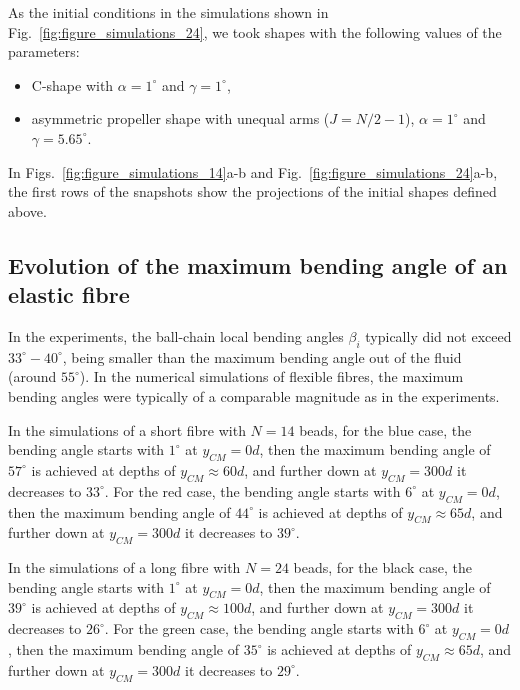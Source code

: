 \documentclass{article}
\begin{document}
As the initial conditions in the simulations shown in Fig.~\ref{fig:figure_simulations_24}, we took shapes with the following values of the parameters: 
\begin{itemize}
    \item C-shape with $\alpha=1^{\circ}$ and $\gamma=1^{\circ}$, %
    \item asymmetric propeller shape with unequal arms ($J\!=\!N/2-1$), $\alpha=1^{\circ}$ and $\gamma=5.65^{\circ}$. %
\end{itemize}

In Figs.~\ref{fig:figure_simulations_14}a-b and Fig.~\ref{fig:figure_simulations_24}a-b, the first rows of the snapshots show the projections of the initial shapes defined above. 

    

\subsection{Evolution of the maximum  bending angle of an elastic fibre} %

In the experiments, the ball-chain local bending angles $\beta_i$ typically did not exceed $33^{\circ}-40^{\circ}$, being smaller than the maximum bending angle out of the fluid (around $55^{\circ}$). In the numerical simulations of flexible fibres, the maximum bending angles were typically of a comparable magnitude as in the experiments. 

In the simulations of a short fibre with $N=14$ beads, for the blue case, the bending angle starts with $1^{\circ}$ at $y_{CM}=0d$, then the maximum bending angle of $57^{\circ}$ is achieved at depths of $y_{CM} \approx 60d$, 
and further down at $y_{CM}=300d$ it decreases to $33^{\circ}$. 
For the red case, the bending angle starts with $6^{\circ}$ at $y_{CM}=0d$, then the maximum bending angle of $44^{\circ}$ is achieved at depths of $y_{CM} \approx 65d$, 
and further down at $y_{CM}=300d$ it decreases to $39^{\circ}$.

In the simulations of a long fibre with $N=24$ beads, for the black case, the bending angle starts with $1^{\circ}$ at $y_{CM}=0d$, then the maximum bending angle of $39^{\circ}$ is achieved at depths of $y_{CM} \approx 100d$, 
and further down at $y_{CM}=300d$ it decreases to $26^{\circ}$.
For the green case, the bending angle starts with $6^{\circ}$ at $y_{CM}=0d$, then the maximum bending angle of $35^{\circ}$ is achieved at depths of $y_{CM} \approx 65d$, 
and further down at $y_{CM}=300d$ it decreases to $29^{\circ}$. 
\end{document}
